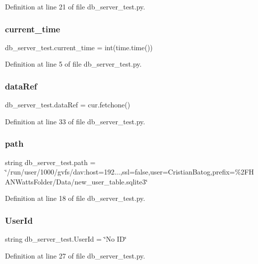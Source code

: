 Definition at line 21 of file db\+\_\+server\+\_\+test.\+py.

\mbox{\label{namespacedb__server__test_ae8334a9cb34096110d6a1545e05588d6}} 
\subsubsection{current\+\_\+time}
{\footnotesize\ttfamily db\+\_\+server\+\_\+test.\+current\+\_\+time = int(time.\+time())}



Definition at line 5 of file db\+\_\+server\+\_\+test.\+py.

\mbox{\label{namespacedb__server__test_a788f28f6eb52d35985510acf5edf5d18}} 
\subsubsection{data\+Ref}
{\footnotesize\ttfamily db\+\_\+server\+\_\+test.\+data\+Ref = cur.\+fetchone()}



Definition at line 33 of file db\+\_\+server\+\_\+test.\+py.

\mbox{\label{namespacedb__server__test_abf2c564921f2b2cca9bf66c72e2a170c}} 
\subsubsection{path}
{\footnotesize\ttfamily string db\+\_\+server\+\_\+test.\+path = \char`\"{}/run/user/1000/gvfs/dav\+:host=192...,ssl=false,user=Cristian\+Batog,prefix=\%2\+F\+H\+A\+N\+Watts\+Folder/\+Data/new\+\_\+user\+\_\+table.\+sqlite3\char`\"{}}



Definition at line 18 of file db\+\_\+server\+\_\+test.\+py.

\mbox{\label{namespacedb__server__test_a3d2b6991d62c97e15890d6ad6a886837}} 
\subsubsection{User\+Id}
{\footnotesize\ttfamily string db\+\_\+server\+\_\+test.\+User\+Id = \char`\"{}No ID\char`\"{}}



Definition at line 27 of file db\+\_\+server\+\_\+test.\+py.

